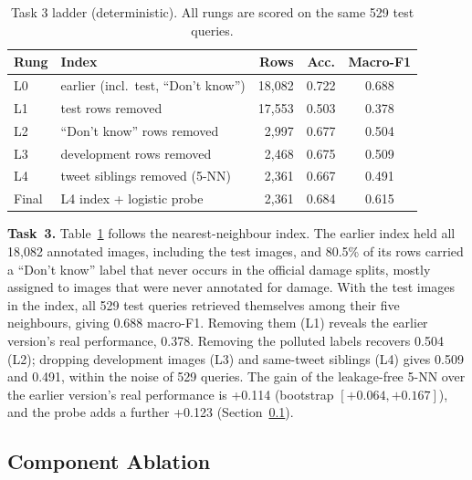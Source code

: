 \documentclass[conference]{IEEEtran}
\begin{document}
\begin{table}[t]
\centering
\caption{Task 3 ladder (deterministic). All rungs are scored on the same 529 test queries.}
\label{tab:ladder3}
\footnotesize
\setlength{\tabcolsep}{3pt}
\begin{tabular}{llrcc}
\toprule
Rung & Index & Rows & Acc. & Macro-F1 \\
\midrule
L0 & earlier (incl.\ test, ``Don't know'') & 18,082 & 0.722 & 0.688 \\
L1 & test rows removed & 17,553 & 0.503 & 0.378 \\
L2 & ``Don't know'' rows removed & 2,997 & 0.677 & 0.504 \\
L3 & development rows removed & 2,468 & 0.675 & 0.509 \\
L4 & tweet siblings removed (5-NN) & 2,361 & 0.667 & 0.491 \\
Final & L4 index + logistic probe & 2,361 & 0.684 & 0.615 \\
\bottomrule
\end{tabular}
\end{table}

\textbf{Task~3.} Table~\ref{tab:ladder3} follows the nearest-neighbour index. The earlier index held all 18,082 annotated images, including the test images, and 80.5\% of its rows carried a ``Don't know'' label that never occurs in the official damage splits, mostly assigned to images that were never annotated for damage. With the test images in the index, all 529 test queries retrieved themselves among their five neighbours, giving 0.688 macro-F1. Removing them (L1) reveals the earlier version's real performance, 0.378. Removing the polluted labels recovers 0.504 (L2); dropping development images (L3) and same-tweet siblings (L4) gives 0.509 and 0.491, within the noise of 529 queries. The gain of the leakage-free 5-NN over the earlier version's real performance is +0.114 (bootstrap $[+0.064, +0.167]$), and the probe adds a further +0.123 (Section~\ref{sec:component}).

\subsection{Component Ablation}
\label{sec:component}
\end{document}
